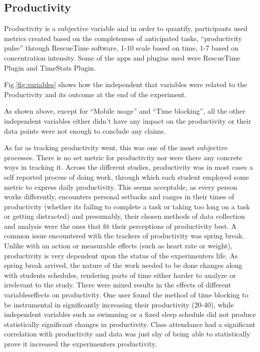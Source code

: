 \subsection{Productivity}


Productivity is a subjective variable and in order to quantify, participants used metrics created based on the completeness of anticipated tasks, \enquote{productivity pulse} through RescueTime software, 1-10 scale based on time, 1-7 based on concentration intensity. Some of the apps and plugins used were RescueTime Plugin  and TimeStats Plugin.

Fig.\ref{fig:variables} shows how the independent that variables were related to the Productivity and its outcome at the end of the experiment.

As shown above, except for \enquote{Mobile usage} and \enquote{Time blocking}, all the other independent variables either didn’t have any impact on the productivity or their data points were not enough to conclude any claims.

As far as tracking productivity went, this was one of the most subjective processes.  There is no set metric for productivity nor were there any concrete ways in tracking it.  Across the different studies, productivity was in most cases a self reported process of doing work, through which each student employed some metric to express daily productivity.  This seems acceptable, as every person works differently, encounters personal setbacks and ranges in their times of productivity (whether it\textquotesingle s failing to complete a task or taking too long on a task or getting distracted) and presumably, their chosen methods of data collection and analysis were the ones that fit their perceptions of productivity best.  A common issue encountered with the trackers of productivity was spring break.  Unlike with an action or measurable effects (such as heart rate or weight), productivity is very dependent upon the status of the experimenter\textquotesingle s life.  As spring break arrived, the nature of the work needed to be done changes along with students schedules, rendering parts of time either harder to analyze or irrelevant to the study.  There were mixed results in the effects of different variables\textquotesingle  effects on productivity.  One user found the method of time blocking to be instrumental in significantly increasing their productivity (20-40), while independent variables such as swimming or a fixed sleep schedule did not produce statistically significant changes in productivity.  Class attendance had a significant correlation with productivity and data was just shy of being able to statistically prove it increased the experimenter\textquotesingle s productivity. 

